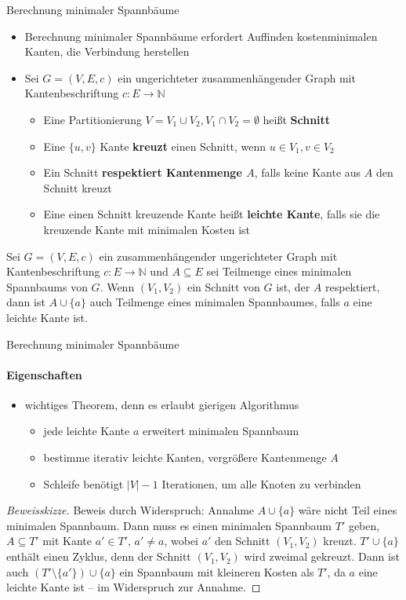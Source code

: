 \documentclass{vorlesung}
\newcommand{\mrk}[1]{\textcolor{ubrot}{\bfseries #1}}
\begin{document}
\begin{frame}{Berechnung minimaler Spannbäume}
\begin{itemize}
	\item Berechnung minimaler Spannbäume erfordert Auffinden kostenminimalen Kanten, die Verbindung herstellen
	\item Sei $G=(V,E,c)$ ein ungerichteter zusammenhängender Graph mit Kantenbeschriftung $c:E\to\mathbb{N}$
	\begin{itemize}
		\item Eine Partitionierung $V = V_1 \cup V_2, V_1\cap V_2=\emptyset$ heißt \mrk{Schnitt}
		\item Eine $\{u,v\}$ Kante \mrk{kreuzt} einen Schnitt, wenn $u\in V_1, v\in V_2$
		\item Ein Schnitt \mrk{respektiert Kantenmenge $A$}, falls keine Kante aus $A$ den Schnitt kreuzt
		\item Eine  einen Schnitt kreuzende Kante heißt \mrk{leichte Kante}, falls sie die kreuzende Kante mit minimalen Kosten ist
	\end{itemize}
\end{itemize}
\begin{theorem}
Sei $G=(V,E,c)$ ein zusammenhängender ungerichteter Graph mit \label{theo:leicht} Kantenbeschriftung $c:E\to\mathbb{N}$ und $A\subseteq E$ sei Teilmenge eines minimalen Spannbaums von $G$. Wenn $(V_1, V_2)$ ein Schnitt von $G$ ist, der $A$ respektiert, dann ist $A\cup \{a\}$ auch Teilmenge eines minimalen Spannbaumes, falls $a$ eine leichte Kante ist.
\end{theorem}
\end{frame}
%
\begin{frame}{Berechnung minimaler Spannbäume}
\framesubtitle{Eigenschaften}
\begin{itemize}
	\item wichtiges Theorem, denn es erlaubt gierigen Algorithmus
	\begin{itemize}
		\item jede leichte Kante $a$ erweitert minimalen Spannbaum
		\item[$\leadsto$] bestimme iterativ leichte Kanten, vergrößere Kantenmenge $A$
		\item Schleife benötigt $|V|-1$ Iterationen, um alle Knoten zu verbinden
	\end{itemize}
\end{itemize}
\begin{proof}[Beweisskizze]
Beweis durch Widerspruch: Annahme $A\cup\{a\}$ wäre nicht Teil eines minimalen Spannbaum. Dann muss es einen minimalen Spannbaum $T'$ geben, $A\subseteq T'$ mit Kante $a'\in T'$, $a'\neq a$, wobei $a'$ den Schnitt $(V_1, V_2)$ kreuzt.
$T' \cup \{ a \}$ enthält einen Zyklus, denn der Schnitt $(V_1, V_2)$ wird zweimal gekreuzt. Dann ist auch $(T' \setminus \{a'\}) \cup \{a\}$ ein Spannbaum mit kleineren Kosten als $T'$, da $a$ eine leichte Kante ist -- im Widerspruch zur Annahme.
\end{proof}
\end{frame}
\end{document}
